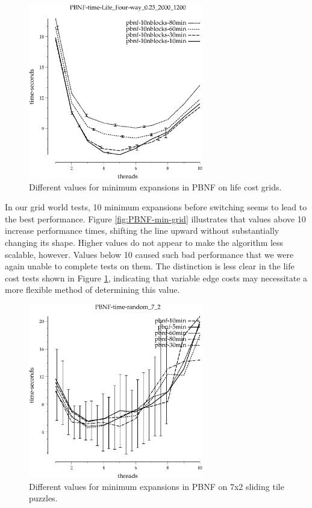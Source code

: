 \documentclass{article}
\begin{document}
\begin{figure}[h!]
\includegraphics[width=3in]{../graphs/grid_life_four-way_0.25_2000_1200/PBNF-time-Life_Four-way_0.25_2000_1200.eps}
\caption{Different values for minimum expansions in PBNF on life cost grids.}
\label{fig:PBNF-min-life}
\end{figure}

In our grid world tests, 10 minimum expansions before switching seems to lead to the best performance. Figure \ref{fig:PBNF-min-grid} illustrates that values above 10 increase performance times, shifting the line upward without substantially changing its shape. Higher values do not appear to make the algorithm less scalable, however. Values below 10 caused such bad performance that we were again unable to complete tests on them. The distinction is less clear in the life cost tests shown in Figure \ref{fig:PBNF-min-life}, indicating that variable edge costs may necessitate a more flexible method of determining this value.

\begin{figure}[h!]
\includegraphics[width=3in]{../graphs/tiles_random_7_2/PBNF-time-random_7_2.eps}
\caption{Different values for minimum expansions in PBNF on 7x2 sliding tile puzzles.}
\label{fig:PBNF-min-tile}
\end{figure}
\end{document}
